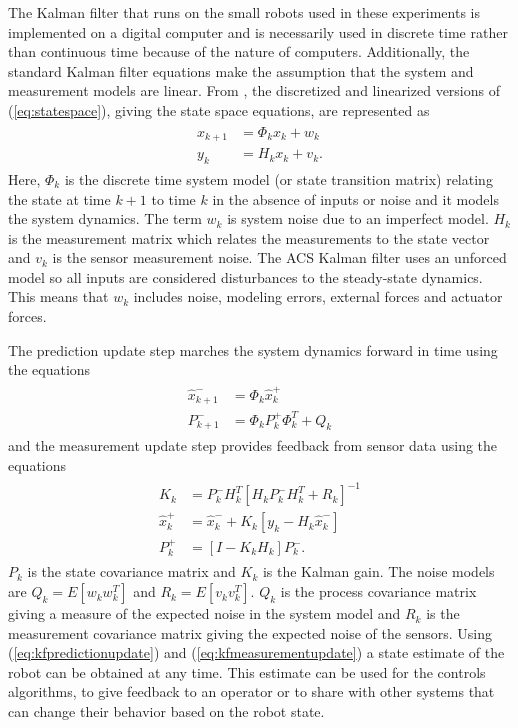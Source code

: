 The Kalman filter that runs on the small robots used in these experiments is implemented on a digital computer and is necessarily used in discrete time rather than continuous time because of the nature of computers. Additionally, the standard Kalman filter equations make the assumption that the system and measurement models are linear. From \cite{Kelly_1994_338}, \cite{Simon06OptimalEstimation} the discretized and linearized versions of (\ref{eq:statespace}), giving the state space equations, are represented as
\begin{align*}
\begin{split}
x_{k+1} &= \Phi_kx_k + w_k \\
y_k &= H_kx_k + v_k.
\end{split}
\end{align*}
Here, $\Phi_k$ is the discrete time system model (or state transition matrix) relating the state at time $k+1$ to time $k$ in the absence of inputs or noise and it models the system dynamics. The term $w_k$ is system noise due to an imperfect model. $H_k$ is the measurement matrix which relates the measurements to the state vector and $v_k$ is the sensor measurement noise. The ACS Kalman filter uses an unforced model so all inputs are considered disturbances to the steady-state dynamics. This means that $w_k$ includes noise, modeling errors, external forces and actuator forces.

The prediction update step marches the system dynamics forward in time using the equations
\begin{align}
\label{eq:kfpredictionupdate}
\begin{split}
\hat{x}_{k+1}^- &= \Phi_k\hat{x}_k^+ \\
P_{k+1}^- &= \Phi_kP_k^+\Phi_k^T + Q_k
\end{split}
\end{align}
and the measurement update step provides feedback from sensor data using the equations
\begin{align}
\label{eq:kfmeasurementupdate}
\begin{split}
K_k &= P_k^-H_k^T\left[H_kP_k^-H_k^T + R_k\right]^{-1} \\
\hat{x}_k^+ &= \hat{x}_k^- + K_k\left[y_k - H_k\hat{x}_k^-\right] \\
P_k^+ &= \left[I - K_kH_k\right]P_k^-.
\end{split}
\end{align}
$P_k$ is the state covariance matrix and $K_k$ is the Kalman gain. The noise models are $Q_k = E[w_kw_k^T]$ and $R_k = E[v_kv_k^T]$. $Q_k$ is the process covariance matrix giving a measure of the expected noise in the system model and $R_k$ is the measurement covariance matrix giving the expected noise of the sensors. Using (\ref{eq:kfpredictionupdate}) and (\ref{eq:kfmeasurementupdate}) a state estimate of the robot can be obtained at any time. This estimate can be used for the controls algorithms, to give feedback to an operator or to share with other systems that can change their behavior based on the robot state.

